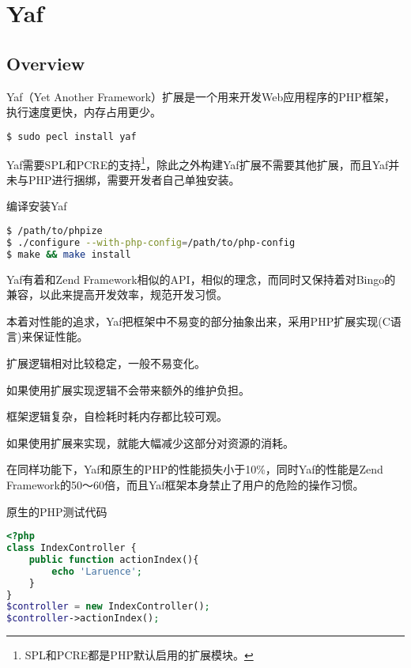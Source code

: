 \part{Yaf}


\chapter{Overview}

Yaf（Yet Another Framework）扩展是一个用来开发Web应用程序的PHP框架，执行速度更快，内存占用更少。

\begin{lstlisting}[language=bash]
$ sudo pecl install yaf
\end{lstlisting}

Yaf需要SPL和PCRE的支持\footnote{SPL和PCRE都是PHP默认启用的扩展模块。}，除此之外构建Yaf扩展不需要其他扩展，而且Yaf并未与PHP进行捆绑，需要开发者自己单独安装。




\begin{example}
编译安装Yaf
\begin{lstlisting}[language=bash]
$ /path/to/phpize
$ ./configure --with-php-config=/path/to/php-config
$ make && make install
\end{lstlisting}
\end{example}

Yaf有着和Zend Framework相似的API，相似的理念，而同时又保持着对Bingo的兼容，以此来提高开发效率，规范开发习惯。

本着对性能的追求，Yaf把框架中不易变的部分抽象出来，采用PHP扩展实现(C语言)来保证性能。

\begin{compactitem}
\item 扩展逻辑相对比较稳定，一般不易变化。

如果使用扩展实现逻辑不会带来额外的维护负担。
\item 框架逻辑复杂，自检耗时耗内存都比较可观。

如果使用扩展来实现，就能大幅减少这部分对资源的消耗。
\end{compactitem}

在同样功能下，Yaf和原生的PHP的性能损失小于10\%，同时Yaf的性能是Zend Framework的50～60倍，而且Yaf框架本身禁止了用户的危险的操作习惯。

\begin{example}
原生的PHP测试代码
\begin{lstlisting}[language=PHP]
<?php
class IndexController {
    public function actionIndex(){
        echo 'Laruence';
    }
}
$controller = new IndexController();
$controller->actionIndex();
\end{lstlisting}
\end{example}


